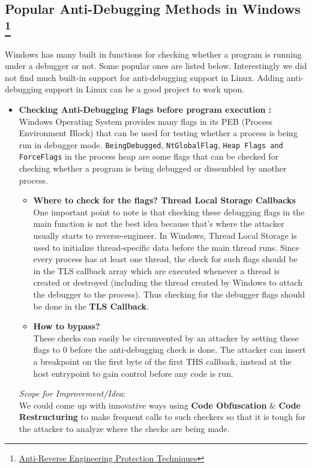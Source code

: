 \documentclass[11pt]{article}
\begin{document}
\subsection{Popular Anti-Debugging Methods in Windows \footnote{\href{https://www.apriorit.com/dev-blog/367-anti-reverse-engineering-protection-techniques-to-use-before-releasing-software}{Anti-Reverse Engineering Protection Techniques}}}
Windows has many built in functions for checking whether a program is running under a debugger or not. Some popular ones are listed below. Interestingly we did not find much built-in support for anti-debugging support in Linux. Adding anti-debugging support in Linux can be  a good project to work upon.
\begin{itemize}
    \item{\textbf{Checking Anti-Debugging Flags before program execution : }\\
    Windows Operating System provides many flags in its PEB  (Process Environment Block) that can be used for testing whether a process is being run in debugger mode. \texttt{BeingDebugged}, \texttt{NtGlobalFlag}, \texttt{Heap Flags and ForceFlags} in the process heap are some flags that can be checked for checking whether a program is being debugged or dissembled by another process.
    \begin{itemize}
        \item {\textbf{Where to check for the flags? Thread Local Storage Callbacks}\\
        One important point to note is that checking these debugging flags in the main function is not the best idea because that's where the attacker usually starts to reverse-engineer. In Windows, Thread Local Storage is used to initialize thread-specific data before the main thread runs. Since every process has at least one thread, the check for such flags should be in 
        the TLS callback array which are executed whenever a thread is created or destroyed (including the thread created by Windows to attach the debugger to the process). Thus checking for the debugger flags should be done in the \textbf{TLS Callback}.
        }
        \item{\textbf{How to bypass?}\\
        These checks can easily be circumvented by an attacker by setting these flags to 0 before the anti-debugging check is done. The attacker can insert a breakpoint on the first byte of the first THS callback, instead at the host entrypoint to gain control before any code is run.}
    \end{itemize}
\textit{Scope for Improvement/Idea}:\\We could come up with innovative ways using \textbf{Code Obfuscation} \& \textbf{Code Restructuring} to make frequent calls to such checkers so that it is tough for the attacker to analyze where the checks are being made.
    }


\end{itemize}
\end{document}
